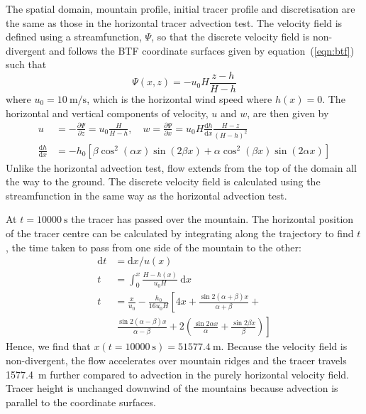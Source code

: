 \documentclass{ametsoc}
\begin{document}
The spatial domain, mountain profile, initial tracer profile and discretisation are the same as those in the horizontal tracer advection test.  The velocity field is defined using a streamfunction, $\Psi$, so that the discrete velocity field is non-divergent and follows the BTF coordinate surfaces given by equation~(\ref{eqn:btf}) such that
\begin{equation}
	\Psi(x,z) = -u_0 H \frac{z - h}{H - h} \label{eqn:streamfunc-btf}
\end{equation}
where $u_0 = \SI{10}{\meter\per\second}$, which is the horizontal wind speed where $h(x) = 0$.
The horizontal and vertical components of velocity, $u$ and $w$, are then given by
\begin{align}
	u &= -\frac{\partial \Psi}{\partial z} = u_0 \frac{H}{H - h}, \quad w = \frac{\partial \Psi}{\partial x} = u_0 H \frac{\mathrm{d} h}{\mathrm{d} x} \frac{H - z}{\left( H - h \right)^2} \label{eqn:uw-btf} \\
	\frac{\mathrm{d} h}{\mathrm{d} x} &= - h_0 \left[ 
		\beta \cos^2 \left( \alpha x \right) \sin \left( 2 \beta x \right) +
		\alpha \cos^2 \left( \beta x \right) \sin \left( 2 \alpha x \right)
	\right]
\end{align}
Unlike the horizontal advection test, flow extends from the top of the domain all the way to the ground.  The discrete velocity field is calculated using the streamfunction in the same way as the horizontal advection test.

At $t = \SI{10000}{\second}$ the tracer has passed over the mountain.  The horizontal position of the tracer centre can be calculated by integrating along the trajectory to find $t$, the time taken to pass from one side of the mountain to the other:
\begin{align}
	\mathrm{d}t &= \mathrm{d}x / u(x) \\
	t &= \int_0^x \frac{H - h(x)}{u_0 H}\:\mathrm{d}x \\
	t &= \frac{x}{u_0} - \frac{h_0}{16 u_0 H} \left[ 4x + \frac{\sin 2 (\alpha + \beta) x}{\alpha + \beta} \right.+ \nonumber \\
   &\ \left. \frac{\sin 2(\alpha - \beta) x}{\alpha - \beta} + 2 \left( \frac{\sin 2\alpha x}{\alpha} + \frac{\sin 2\beta x}{\beta} \right) \right]
\end{align}
Hence, we find that \(x(t=\SI{10000}{\second}) = \SI{51577.4}{\meter}\).  Because the velocity field is non-divergent, the flow accelerates over mountain ridges and the tracer travels \SI{1577.4}{\meter} further compared to advection in the purely horizontal velocity field.  Tracer height is unchanged downwind of the mountains because advection is parallel to the coordinate surfaces.
\end{document}
